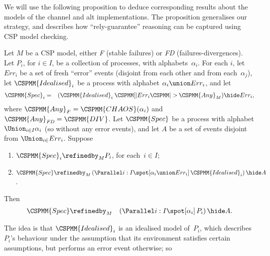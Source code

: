


\def\Idealised{\CSPMM{Idealised}}
\def\Spec{\CSPMM{Spec}}

We will use the following proposition to deduce corresponding results about
the models of the channel and alt implementations.  The proposition
generalises our strategy, and describes how ``rely-guarantee'' reasoning can
be captured using CSP model checking.
%
\begin{prop}
Let $M$ be a CSP model, either {\it F} (stable failures) or {\it FD}
(failures-divergences).  Let $P_i$, for $i \in I$, be a collection of
processes, with alphabets~$\alpha_i$.  For each $i$, let $Err_i$ be a set of
fresh ``error'' events (disjoint from each other and from each~$\alpha_j$),
let $\Idealised_i$ be a process with alphabet $\alpha_i \union Err_i$, and let
\begin{eqnarray*}
\Spec_i & = & (\Idealised_i \throw{Err_i} \CSPMM{Any}_M) \hide Err_i,
\end{eqnarray*} 
where $\CSPMM{Any}_F = \CSPMM{CHAOS}(\alpha_i)$ and $\CSPMM{Any}_{\it FD} =
\CSPMM{DIV}$.
%
Let $\Spec$ be a process with alphabet $\Union_{i \in I} \alpha_i$ (so without
any error events), and let $A$ be a set of events disjoint from $\Union_{i \in
} Err_i$.  Suppose
\begin{enumerate}
\item\label{rg-1} $\Spec_i \refinedby_M P_i$, for each~$i \in I$;

\item\label{rg-2} $\Spec \refinedby_M 
 \left( \Parallel i:I \spot [\alpha_i \union Err_i] \, \Idealised_i \right)
 \hide A$. 
\end{enumerate}
Then
\begin{eqnarray*}
\Spec & \refinedby_M & 
  \left( \Parallel i:I \spot [\alpha_i] \, P_i \right) \hide A.
\end{eqnarray*}
\end{prop}
%
The idea is that $\Idealised_i$ is an idealised model of~$P_i$, which
describes $P_i$'s behaviour under the assumption that its environment
satisfies certain assumptions, but performs an error event otherwise; so
